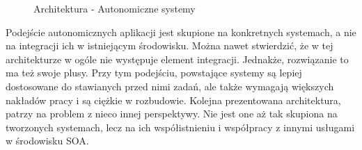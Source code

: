 \setlength\fboxsep{20pt}
\setlength\fboxrule{1pt}
\begin{figure}[!h]
	\centering
	\caption{Architektura - Autonomiczne systemy}\label{fig:autonomiczne_systemy}
\end{figure}

Podejście autonomicznych aplikacji jest  skupione na konkretnych systemach, a nie na integracji ich w istniejącym środowisku. Można nawet stwierdzić, że w tej architekturze w ogóle nie występuje element integracji. Jednakże, rozwiązanie to ma też swoje plusy. Przy tym podejściu, powstające systemy są lepiej dostosowane do stawianych przed nimi zadań, ale także wymagają większych nakładów pracy i są ciężkie w rozbudowie. Kolejna prezentowana architektura,  patrzy na problem z nieco innej perspektywy. Nie jest one aż tak  skupiona na tworzonych systemach, lecz na ich współistnieniu i współpracy z innymi usługami w środowisku SOA.

